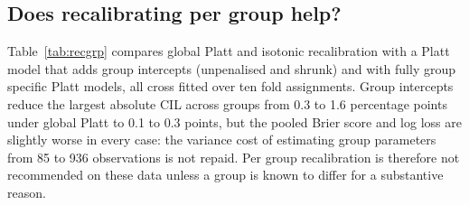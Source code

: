 \documentclass[11pt,a4paper]{article}
\begin{document}
\subsection{Does recalibrating per group help?}
Table~\ref{tab:recgrp} compares global Platt and isotonic recalibration with a Platt model that adds group intercepts (unpenalised and shrunk) and with fully group specific Platt models, all cross fitted over ten fold assignments. Group intercepts reduce the largest absolute CIL across groups from 0.3 to 1.6 percentage points under global Platt to 0.1 to 0.3 points, but the pooled Brier score and log loss are slightly worse in every case: the variance cost of estimating group parameters from 85 to 936 observations is not repaid. Per group recalibration is therefore not recommended on these data unless a group is known to differ for a substantive reason.
\end{document}
